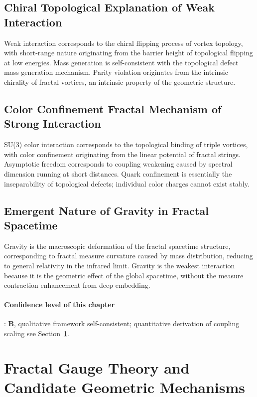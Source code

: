\documentclass[12pt,a4paper,twocolumn]{article}
\begin{document}
\subsection{Chiral Topological Explanation of Weak Interaction}
Weak interaction corresponds to the chiral flipping process of vortex topology, with short-range nature originating from the barrier height of topological flipping at low energies. Mass generation is self-consistent with the topological defect mass generation mechanism. Parity violation originates from the intrinsic chirality of fractal vortices, an intrinsic property of the geometric structure.

\subsection{Color Confinement Fractal Mechanism of Strong Interaction}
\label{subsec:strong_force}
SU(3) color interaction corresponds to the topological binding of triple vortices, with color confinement originating from the linear potential of fractal strings. Asymptotic freedom corresponds to coupling weakening caused by spectral dimension running at short distances. Quark confinement is essentially the inseparability of topological defects; individual color charges cannot exist stably.

\subsection{Emergent Nature of Gravity in Fractal Spacetime}
Gravity is the macroscopic deformation of the fractal spacetime structure, corresponding to fractal measure curvature caused by mass distribution, reducing to general relativity in the infrared limit. Gravity is the weakest interaction because it is the geometric effect of the global spacetime, without the measure contraction enhancement from deep embedding.

\paragraph{Confidence level of this chapter}: \textbf{B}, qualitative framework self-consistent; quantitative derivation of coupling scaling see Section~\ref{sec:gauge_fractal}.

\section{Fractal Gauge Theory and Candidate Geometric Mechanisms}
\label{sec:gauge_fractal}
\label{sec:gauge_fractal}
\end{document}
